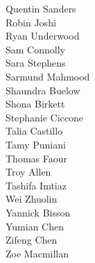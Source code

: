 \begin{multicols}{3}
\begin{center}
Quentin Sanders\\
\columnbreak
Robin Joshi\\
Ryan Underwood\\
Sam Connolly\\
Sara Stephens\\
Sarmund Mahmood\\
Shaundra Buelow\\
Shona Birkett\\
Stephanie Ciccone\\
Talia Castillo\\
Tamy Puniani\\
Thomas Faour\\
Troy Allen\\
Tashifa Imtiaz\\
Wei Zhuolin\\
Yannick Bisson\\
Yumian Chen\\
Zifeng Chen\\
Zoe Macmillan
\end{center}
\end{multicols}
